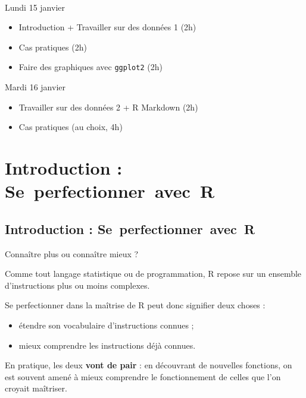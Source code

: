 \documentclass[12pt,handout,ignorenonframetext,]{beamer}
\providecommand{\tightlist}{%
  \setlength{\itemsep}{0pt}\setlength{\parskip}{0pt}}
\begin{document}
\begin{frame}[fragile]{~}

\large

Lundi 15 janvier

\begin{itemize}
\tightlist
\item
  Introduction + Travailler sur des données 1 (2h)
\item
  Cas pratiques (2h)
\item
  Faire des graphiques avec \texttt{ggplot2} (2h)
\end{itemize}

\pause Mardi 16 janvier

\begin{itemize}
\tightlist
\item
  Travailler sur des données 2 + R Markdown (2h)
\item
  Cas pratiques (au choix, 4h)
\end{itemize}

\end{frame}

\section{Introduction :
Se~perfectionner~avec~R}\label{introduction-seperfectionneravecr}

\subsection*{Introduction : Se\ perfectionner\ avec\ R}

\begin{frame}{Connaître plus ou connaître mieux ?}

Comme tout langage statistique ou de programmation, R repose sur un
ensemble d'instructions plus ou moins complexes.

\pause \bigskip
Se perfectionner dans la maîtrise de R peut donc signifier deux choses :

\begin{itemize}
\tightlist
\item
  étendre son \og vocabulaire \fg{} d'instructions connues ;
\item
  mieux comprendre les instructions déjà connues.
\end{itemize}

\pause \bigskip
En pratique, les deux \textbf{vont de pair} : en découvrant de nouvelles
fonctions, on est souvent amené à mieux comprendre le fonctionnement de
celles que l'on croyait maîtriser.

\end{frame}
\end{document}
